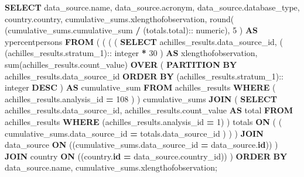 \documentclass[
]{book}
\newenvironment{Shaded}{\begin{snugshade}}{\end{snugshade}}
\newcommand{\DataTypeTok}[1]{\textcolor[rgb]{0.13,0.29,0.53}{#1}}
\newcommand{\DecValTok}[1]{\textcolor[rgb]{0.00,0.00,0.81}{#1}}
\newcommand{\FunctionTok}[1]{\textcolor[rgb]{0.00,0.00,0.00}{#1}}
\newcommand{\KeywordTok}[1]{\textcolor[rgb]{0.13,0.29,0.53}{\textbf{#1}}}
\newcommand{\NormalTok}[1]{#1}
\newcommand{\OperatorTok}[1]{\textcolor[rgb]{0.81,0.36,0.00}{\textbf{#1}}}
\begin{document}
\begin{Shaded}
\begin{Highlighting}[]
\KeywordTok{SELECT}
\NormalTok{  data\_source.name,}
\NormalTok{  data\_source.acronym,}
\NormalTok{  data\_source.database\_type,}
\NormalTok{  country.country,}
\NormalTok{  cumulative\_sums.xlengthofobservation,}
  \FunctionTok{round}\NormalTok{(}
\NormalTok{    (cumulative\_sums.cumulative\_sum }\OperatorTok{/}\NormalTok{ (totals.total):: }\DataTypeTok{numeric}\NormalTok{),}
    \DecValTok{5}
\NormalTok{  ) }\KeywordTok{AS}\NormalTok{ ypercentpersons}
\KeywordTok{FROM}
\NormalTok{  (}
\NormalTok{    (}
\NormalTok{      (}
\NormalTok{        (}
          \KeywordTok{SELECT}
\NormalTok{            achilles\_results.data\_source\_id,}
\NormalTok{            (}
\NormalTok{              (achilles\_results.stratum\_1):: }\DataTypeTok{integer} \OperatorTok{*} \DecValTok{30}
\NormalTok{            ) }\KeywordTok{AS}\NormalTok{ xlengthofobservation,}
            \FunctionTok{sum}\NormalTok{(achilles\_results.count\_value) }\KeywordTok{OVER}\NormalTok{ (}
              \KeywordTok{PARTITION} \KeywordTok{BY}\NormalTok{ achilles\_results.data\_source\_id}
              \KeywordTok{ORDER} \KeywordTok{BY}
\NormalTok{                (achilles\_results.stratum\_1):: }\DataTypeTok{integer} \KeywordTok{DESC}
\NormalTok{            ) }\KeywordTok{AS}\NormalTok{ cumulative\_sum}
          \KeywordTok{FROM}
\NormalTok{            achilles\_results}
          \KeywordTok{WHERE}
\NormalTok{            (}
\NormalTok{              achilles\_results.analysis\_id }\OperatorTok{=} \DecValTok{108}
\NormalTok{            )}
\NormalTok{        ) cumulative\_sums}
        \KeywordTok{JOIN}\NormalTok{ (}
          \KeywordTok{SELECT}
\NormalTok{            achilles\_results.data\_source\_id,}
\NormalTok{            achilles\_results.count\_value }\KeywordTok{AS}\NormalTok{ total}
          \KeywordTok{FROM}
\NormalTok{            achilles\_results}
          \KeywordTok{WHERE}
\NormalTok{            (achilles\_results.analysis\_id }\OperatorTok{=} \DecValTok{1}\NormalTok{)}
\NormalTok{        ) totals }\KeywordTok{ON}\NormalTok{ (}
\NormalTok{          (}
\NormalTok{            cumulative\_sums.data\_source\_id }\OperatorTok{=}\NormalTok{ totals.data\_source\_id}
\NormalTok{          )}
\NormalTok{        )}
\NormalTok{      )}
      \KeywordTok{JOIN}\NormalTok{ data\_source}
        \KeywordTok{ON}\NormalTok{ ((cumulative\_sums.data\_source\_id }\OperatorTok{=}\NormalTok{ data\_source.}\KeywordTok{id}\NormalTok{))}
\NormalTok{    )}
    \KeywordTok{JOIN}\NormalTok{ country }\KeywordTok{ON}\NormalTok{ ((country.}\KeywordTok{id} \OperatorTok{=}\NormalTok{ data\_source.country\_id))}
\NormalTok{  )}
\KeywordTok{ORDER} \KeywordTok{BY}
\NormalTok{  data\_source.name,}
\NormalTok{  cumulative\_sums.xlengthofobservation;}
\end{Highlighting}
\end{Shaded}
\end{document}
